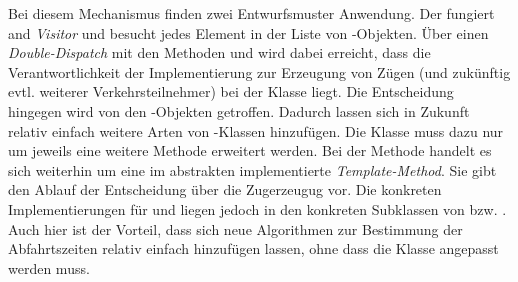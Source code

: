 Bei diesem Mechanismus finden zwei Entwurfsmuster Anwendung. Der  fungiert and \emph{Visitor} und besucht jedes Element in der Liste von -Objekten. Über einen \emph{Double-Dispatch} mit den Methoden  und  wird dabei erreicht, dass die Verantwortlichkeit der Implementierung zur Erzeugung von Zügen (und zukünftig evtl. weiterer Verkehrsteilnehmer) bei der Klasse  liegt. Die Entscheidung hingegen wird von den -Objekten getroffen. Dadurch lassen sich in Zukunft relativ einfach weitere Arten von -Klassen hinzufügen. Die Klasse  muss dazu nur um jeweils eine weitere Methode erweitert werden. Bei der Methode  handelt es sich weiterhin um eine im abstrakten  implementierte \emph{Template-Method}. Sie gibt den Ablauf der Entscheidung über die Zugerzeugug vor. Die konkreten Implementierungen für  und  liegen jedoch in den konkreten Subklassen von   bzw. . Auch hier ist der Vorteil, dass sich neue Algorithmen zur Bestimmung der Abfahrtszeiten relativ einfach hinzufügen lassen, ohne dass die Klasse  angepasst werden muss.
